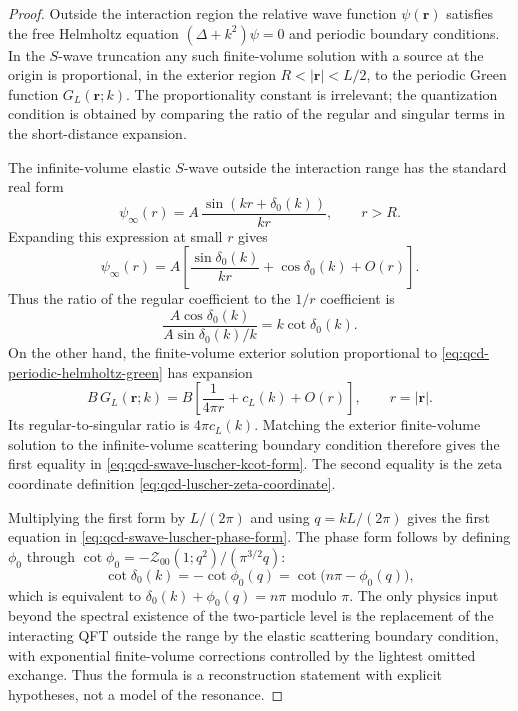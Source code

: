 \begin{proof}
Outside the interaction region the relative wave function
\(\psi(\mathbf r)\) satisfies the free Helmholtz equation
\((\Delta+k^2)\psi=0\) and periodic boundary conditions.  In the \(S\)-wave
truncation any such finite-volume solution with a source at the origin is
proportional, in the exterior region \(R<|\mathbf r|<L/2\), to the periodic
Green function \(G_L(\mathbf r;k)\).  The proportionality constant is
irrelevant; the quantization condition is obtained by comparing the ratio of
the regular and singular terms in the short-distance expansion.

The infinite-volume elastic \(S\)-wave outside the interaction range has the
standard real form
\[
  \psi_{\infty}(r)
  =
  A\,\frac{\sin(kr+\delta_0(k))}{kr},
  \qquad r>R .
\]
Expanding this expression at small \(r\) gives
\[
  \psi_{\infty}(r)
  =
  A\left[
    \frac{\sin\delta_0(k)}{kr}
    +
    \cos\delta_0(k)
    +O(r)
  \right].
\]
Thus the ratio of the regular coefficient to the \(1/r\) coefficient is
\begin{equation}
  \frac{A\cos\delta_0(k)}
       {A\sin\delta_0(k)/k}
  =
  k\cot\delta_0(k).
  \label{eq:qcd-swave-boundary-ratio}
\end{equation}
On the other hand, the finite-volume exterior solution proportional to
\eqref{eq:qcd-periodic-helmholtz-green} has expansion
\[
  B\,G_L(\mathbf r;k)
  =
  B\left[
    \frac1{4\pi r}+c_L(k)+O(r)
  \right],
  \qquad r=|\mathbf r|.
  \]
Its regular-to-singular ratio is \(4\pi c_L(k)\).  Matching the exterior
finite-volume solution to the infinite-volume scattering boundary condition
therefore gives the first equality in
\eqref{eq:qcd-swave-luscher-kcot-form}.  The second equality is the zeta
coordinate definition \eqref{eq:qcd-luscher-zeta-coordinate}.

Multiplying the first form by \(L/(2\pi)\) and using \(q=kL/(2\pi)\) gives
the first equation in \eqref{eq:qcd-swave-luscher-phase-form}.  The phase
form follows by defining \(\phi_0\) through
\(\cot\phi_0=-\mathcal Z_{00}(1;q^2)/(\pi^{3/2}q)\):
\[
  \cot\delta_0(k)=-\cot\phi_0(q)
  =
  \cot\bigl(n\pi-\phi_0(q)\bigr),
  \]
which is equivalent to
\(\delta_0(k)+\phi_0(q)=n\pi\) modulo \(\pi\).  The only physics input beyond
the spectral existence of the two-particle level is the replacement of the
interacting QFT outside the range by the elastic scattering boundary
condition, with exponential finite-volume corrections controlled by the
lightest omitted exchange.  Thus the formula is a reconstruction statement
with explicit hypotheses, not a model of the resonance.
\end{proof}

